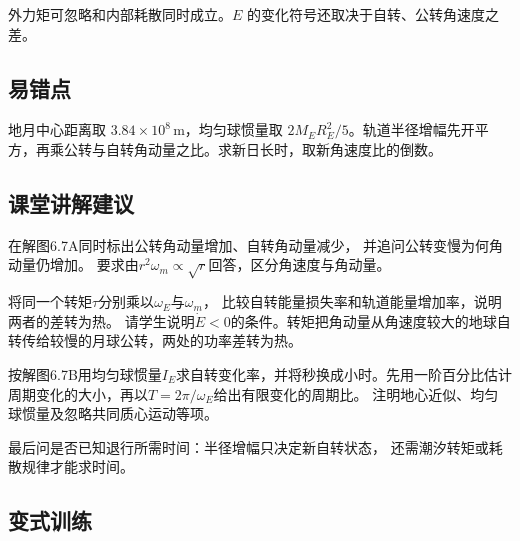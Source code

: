\documentclass[UTF8,fontset=fandol,a4paper,11pt]{ctexart}
\begin{document}
外力矩可忽略和内部耗散同时成立。$E$ 的变化符号还取决于自转、公转角速度之差。



\subsection*{易错点}

地月中心距离取 $3.84\times10^8\,\mathrm m$，均匀球惯量取 $2M_ER_E^2/5$。轨道半径增幅先开平方，再乘公转与自转角动量之比。求新日长时，取新角速度比的倒数。



\subsection*{课堂讲解建议}

在解图6.7A同时标出公转角动量增加、自转角动量减少，
并追问公转变慢为何角动量仍增加。
要求由$r^2\omega_m\propto\sqrt r$回答，区分角速度与角动量。

将同一个转矩$\tau$分别乘以$\omega_E$与$\omega_m$，
比较自转能量损失率和轨道能量增加率，说明两者的差转为热。
请学生说明$\dot E<0$的条件。转矩把角动量从角速度较大的地球自转传给较慢的月球公转，两处的功率差转为热。

按解图6.7B用均匀球惯量$I_E$求自转变化率，并将秒换成小时。先用一阶百分比估计周期变化的大小，再以$T=2\pi/\omega_E$给出有限变化的周期比。
注明地心近似、均匀球惯量及忽略共同质心运动等项。

最后问是否已知退行所需时间：半径增幅只决定新自转状态，
还需潮汐转矩或耗散规律才能求时间。



\subsection*{变式训练}
\end{document}
